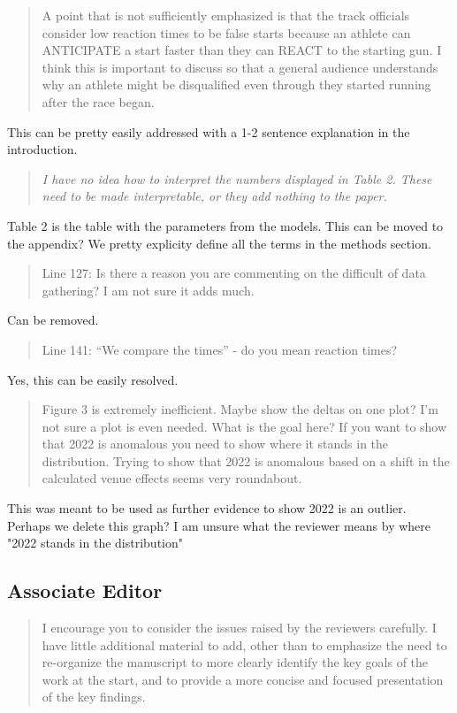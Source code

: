 \documentclass[12pt]{article}
\newenvironment{comment}%
{\begin{quotation}\noindent\small\it\color{darkblue}\ignorespaces%
}{\end{quotation}}
\begin{document}
\begin{comment}
A point that is not sufficiently emphasized is that the track officials consider
low reaction times to be false starts because an athlete can ANTICIPATE a start
faster than they can REACT to the starting gun. I think this is important to
discuss so that a general audience understands why an athlete might be
disqualified even through they started running after the race began.  
\end{comment}

This can be pretty easily addressed with a 1-2 sentence explanation in the
introduction.

\begin{comment}I have no idea how to interpret the numbers displayed in Table 2. These
need to be made interpretable, or they add nothing to the paper.
\end{comment}

Table 2 is the table with the parameters from the models.  This can be moved to
the appendix? We pretty explicity define all the terms in the methods section.

\begin{comment}
Line 127: Is there a reason you are commenting on the difficult of data
gathering? I am not sure it adds much.
\end{comment}

Can be removed.

\begin{comment}
Line 141: “We compare the times” - do you mean reaction times?
\end{comment}

Yes, this can be easily resolved.

\begin{comment}
Figure 3 is extremely inefficient. Maybe show the deltas on one plot? I'm not
sure a plot is even needed. What is the goal here? If you want to show that 2022
is anomalous you need to show where it stands in the distribution. Trying to
show that 2022 is anomalous based on a shift in the calculated venue effects
seems very roundabout.
\end{comment}

This was meant to be used as further evidence to show 2022 is an outlier. Perhaps
we delete this graph? I am unsure what the reviewer means by where "2022 stands
in the distribution"


\subsection*{Associate Editor}
\begin{comment}
I encourage you to consider the issues raised by the reviewers carefully. I have
little additional material to add, other than to emphasize the need to
re-organize the manuscript to more clearly identify the key goals of the work at
the start, and to provide a more concise and focused presentation of the key
findings.
\end{comment}

%
%
\end{document}
